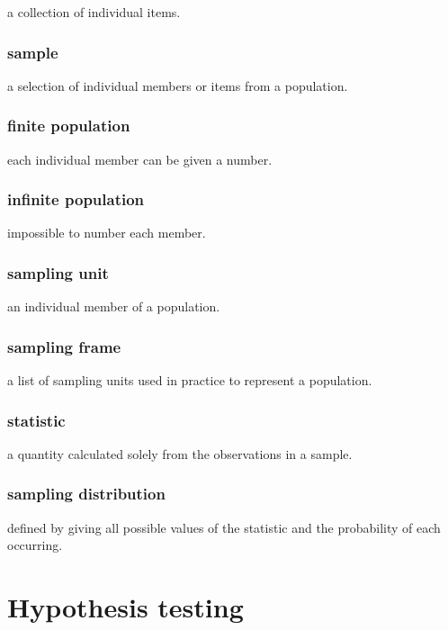 \documentclass[a4paper,9pt]{scrartcl}
\begin{document}
    a collection of individual items.

    \subsubsection{sample}

    a selection of individual members or items from a population.

    \subsubsection{finite population}

    each individual member can be given a number.

    \subsubsection{infinite population}

    impossible to number each member.

    \subsubsection{sampling unit}

    an individual member of a population.

    \subsubsection{sampling frame}
    a list of sampling units used in practice to represent a population.

    \subsubsection{statistic}

    a quantity calculated solely from the observations in a sample.

    \subsubsection{sampling distribution}

    defined by giving all possible values of the statistic and the probability of each occurring.


    \section{Hypothesis testing}
\end{document}
